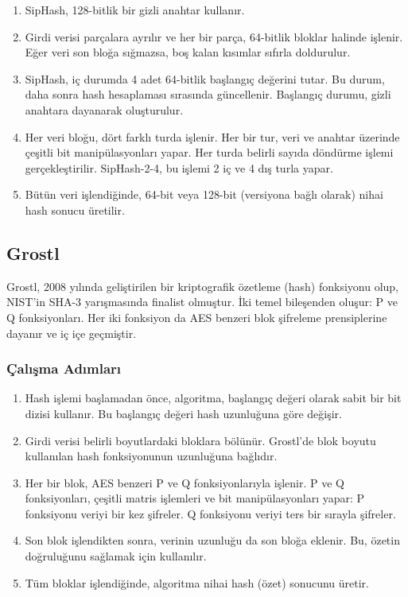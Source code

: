 \begin{enumerate}
    \item SipHash, 128-bitlik bir gizli anahtar kullanır.
    \item Girdi verisi parçalara ayrılır ve her bir parça, 64-bitlik bloklar halinde işlenir. Eğer veri son bloğa sığmazsa, boş kalan kısımlar sıfırla doldurulur.
    \item SipHash, iç durumda 4 adet 64-bitlik başlangıç değerini tutar. Bu durum, daha sonra hash hesaplaması sırasında güncellenir. Başlangıç durumu, gizli anahtara dayanarak oluşturulur.
    \item Her veri bloğu, dört farklı turda işlenir. Her bir tur, veri ve anahtar üzerinde çeşitli bit manipülasyonları yapar. Her turda belirli sayıda döndürme işlemi gerçekleştirilir. SipHash-2-4, bu işlemi 2 iç ve 4 dış turla yapar.
    \item Bütün veri işlendiğinde, 64-bit veya 128-bit (versiyona bağlı olarak) nihai hash sonucu üretilir.
\end{enumerate}

\newpage

\subsection{Grostl}

Grostl, 2008 yılında geliştirilen bir kriptografik özetleme (hash) fonksiyonu olup, NIST’in SHA-3 yarışmasında finalist olmuştur. İki temel bileşenden oluşur: P ve Q fonksiyonları. Her iki fonksiyon da AES benzeri blok şifreleme prensiplerine dayanır ve iç içe geçmiştir.

\subsubsection{Çalışma Adımları}

\begin{enumerate}
    \item Hash işlemi başlamadan önce, algoritma, başlangıç değeri olarak sabit bir bit dizisi kullanır. Bu başlangıç değeri hash uzunluğuna göre değişir.
    \item Girdi verisi belirli boyutlardaki bloklara bölünür. Grostl'de blok boyutu kullanılan hash fonksiyonunun uzunluğuna bağlıdır.
    \item Her bir blok, AES benzeri P ve Q fonksiyonlarıyla işlenir. P ve Q fonksiyonları, çeşitli matris işlemleri ve bit manipülasyonları yapar: P fonksiyonu veriyi bir kez şifreler. Q fonksiyonu veriyi ters bir sırayla şifreler.
    \item Son blok işlendikten sonra, verinin uzunluğu da son bloğa eklenir. Bu, özetin doğruluğunu sağlamak için kullanılır.
    \item Tüm bloklar işlendiğinde, algoritma nihai hash (özet) sonucunu üretir.
\end{enumerate}

